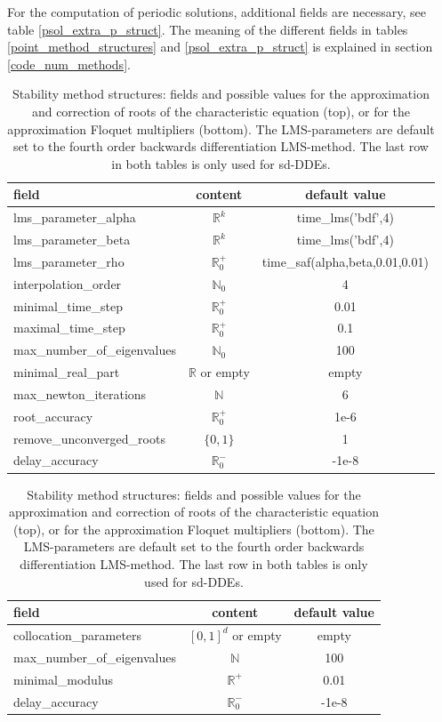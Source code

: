 \documentclass[10pt]{article}
\gdef \RR{{\mathbb R}}
\gdef \NN{{\mathbb N}}
\begin{document}
{For the computation of periodic solutions,
additional fields are necessary, see table \ref{psol_extra_p_struct}.
The meaning of the different fields in tables \ref{point_method_structures} 
and \ref{psol_extra_p_struct} is explained in 
section \ref{code_num_methods}.

\begin{table}[h]
\begin{center}
\begin{tabular}{l|c|c}
field                        & content              & default value  \\\hline 
lms\_parameter\_alpha        & $\RR^k$              & time\_lms('bdf',4) \\
lms\_parameter\_beta         & $\RR^k$              & time\_lms('bdf',4) \\
lms\_parameter\_rho          & $\RR^+_0$            & time\_saf(alpha,beta,0.01,0.01) \\
interpolation\_order         & $\NN_0$              & 4 \\
minimal\_time\_step          & $\RR^+_0$            & 0.01 \\
maximal\_time\_step          & $\RR^+_0$            & 0.1 \\
max\_number\_of\_eigenvalues & $\NN_0$              & 100 \\
minimal\_real\_part          & $\RR$ or empty       & empty \\
max\_newton\_iterations      & $\NN$                & 6 \\ 
root\_accuracy               & $\RR^+_0$            & 1e-6 \\
remove\_unconverged\_roots   & $\{0,1\}$            & 1 \\
delay\_accuracy              & $\RR_0^-$            & -1e-8
\end{tabular}
\begin{tabular}{l|c|c}
field                        & content              & default value  \\\hline 
collocation\_parameters      & $[0,1]^d$ or empty   & empty \\
max\_number\_of\_eigenvalues & $\NN$                & 100 \\
minimal\_modulus             & $\RR^+$              & 0.01 \\
delay\_accuracy              & $\RR_0^-$            & -1e-8
\end{tabular}
\end{center}
\caption{\small\label{meth_stab_struct}
Stability method structures: fields and possible values
for the approximation and correction of roots of the characteristic
equation (top), or
for the approximation Floquet multipliers (bottom).
The LMS-parameters are default set to the fourth order backwards
differentiation LMS-method.
The last row in both tables is only used for sd-DDEs.}
\end{table}

}
\end{document}
